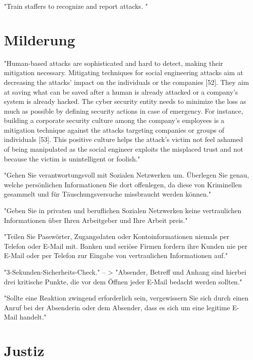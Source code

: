 "Train staffers to recognize and report attacks. "\cite{3_barracuda}

\section{Milderung}

"Human-based attacks are sophisticated and hard to detect, making their mitigation necessary. Mitigating techniques for social engineering attacks aim at
decreasing the attacks’ impact on the individuals or the companies [52]. They aim at saving what can be saved after a human is already attacked or a company’s
system is already hacked. The cyber security entity needs to minimize the loss as much as possible by defining security actions in case of emergency. For instance,
building a corporate security culture among the company’s employees is a mitigation technique against the attacks targeting companies or groups of individuals [53].
This positive culture helps the attack’s victim not feel ashamed of being manipulated as the social engineer exploits the misplaced trust and not because the victim
is unintelligent or foolish."\cite{7_mdpi}


"Gehen Sie verantwortungsvoll mit Sozialen Netzwerken um. Überlegen Sie genau, welche persönlichen Informationen Sie dort offenlegen, da diese von
Kriminellen gesammelt und für Täuschungsversuche missbraucht werden können."\cite{2_bsi}

"Geben Sie in privaten und beruflichen Sozialen Netzwerken keine vertraulichen Informationen über Ihren Arbeitgeber und Ihre Arbeit preis."\cite{2_bsi}

"Teilen Sie Passwörter, Zugangsdaten oder Kontoinformationen niemals per Telefon oder E-Mail mit. Banken und seriöse Firmen fordern ihre Kunden nie per
E-Mail oder per Telefon zur Eingabe von vertraulichen Informationen auf."\cite{2_bsi}

"3-Sekunden-Sicherheits-Check."\cite{2_bsi}
-- > "Absender, Betreff und Anhang sind hierbei drei kritische Punkte, die vor dem Öffnen jeder E-Mail bedacht werden sollten."

"Sollte eine Reaktion zwingend erforderlich sein, vergewissern Sie sich durch einen Anruf bei der Absenderin oder dem Absender, dass es sich um eine
legitime E-Mail handelt."\cite{2_bsi}

\section{Justiz}
